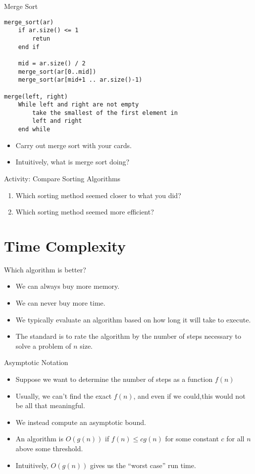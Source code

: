 \documentclass[]{beamer}
\begin{document}
\begin{frame}[fragile]{Merge Sort}
\begin{verbatim}
merge_sort(ar)
    if ar.size() <= 1 
        retun
    end if

    mid = ar.size() / 2
    merge_sort(ar[0..mid])
    merge_sort(ar[mid+1 .. ar.size()-1) 

merge(left, right)
    While left and right are not empty
        take the smallest of the first element in
        left and right
    end while
\end{verbatim}

\begin{itemize}[<+->]
    \item Carry out merge sort with your cards.
    \item Intuitively, what is merge sort doing?
\end{itemize}
\end{frame}

\begin{frame}{Activity: Compare Sorting Algorithms}
    \begin{enumerate}[<+->]
        \item Which sorting method seemed closer to what you did?
        \item Which sorting method seemed more efficient?
    \end{enumerate}
\end{frame}

\section{Time Complexity}
\begin{frame}{Which algorithm is better?}
\begin{itemize}[<+->]
    \item We can always buy more memory.
    \item We can never buy more time.
    \item We typically evaluate an algorithm based on how long it will
        take to execute.
    \item The standard is to rate the algorithm by the number of steps
        necessary to solve a problem of $n$ size.
\end{itemize}
\end{frame}

\begin{frame}{Asymptotic Notation}
\begin{itemize}[<+->]
    \item Suppose we want to determine the number of steps as
        a function $f(n)$
    \item Usually, we can't find the exact $f(n)$, and even if we
        could,this would not be all that meaningful.
    \item We instead compute an asymptotic bound.
    \item An algorithm is $O(g(n))$ if $f(n) \leq c g(n)$ for some
        constant $c$ for all $n$ above some threshold.
    \item Intuitively, $O(g(n))$ gives us the ``worst case'' run time.
\end{itemize}
\end{frame}
\end{document}
